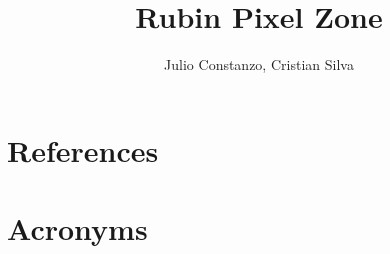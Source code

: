 \documentclass[PMO,authoryear,toc,lsstdraft]{lsstdoc}
\title{Rubin Pixel Zone}
\author{%
Julio Constanzo, Cristian Silva
}
\date{\vcsDate}
\begin{document}
\maketitle




\appendix
\section{References} \label{sec:bib}
\renewcommand{\refname}{} %


\section{Acronyms} \label{sec:acronyms}

\end{document}
